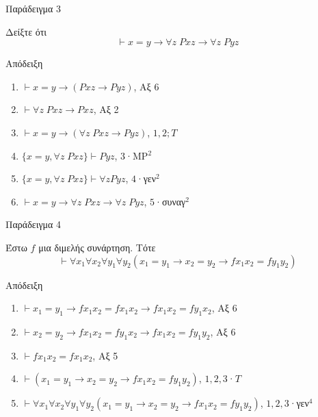 \documentclass{beamer}
\begin{document}
\begin{frame}{Παράδειγμα 3}
  \begin{block}{}
  Δείξτε ότι
    \[
      \vdash x = y \rightarrow \forall z \; Pxz \rightarrow \forall z \; Pyz
    \]
  \end{block}
  \begin{block}{Απόδειξη}
    \begin{enumerate}
      \item $\vdash x = y \rightarrow (Pxz \rightarrow Pyz)$, Αξ 6
      \item $\vdash \forall z \; Pxz \rightarrow Pxz$, Αξ 2
      \item $\vdash x = y \rightarrow (\forall z \; Pxz \rightarrow Pyz)$, $1,2;T$
      \item $\{x = y, \forall z \; Pxz\} \vdash Pyz$, $3$·MP$^2$
      \item $\{x = y, \forall z \; Pxz\} \vdash \forall z Pyz$, $4$·γεν$^2$
      \item $\vdash x = y \rightarrow \forall z \; Pxz \rightarrow \forall z \; Pyz$, $5$·συναγ$^2$
    \end{enumerate}
  \end{block}
\end{frame}

\begin{frame}{Παράδειγμα 4}
  \begin{block}{}
  Έστω $f$ μια διμελής συνάρτηση. Τότε
    \[
      \vdash \forall x_1 \forall x_2 \forall y_1 \forall y_2 (x_1 = y_1 \rightarrow x_2 = y_2 \rightarrow fx_1x_2 = fy_1y_2)
    \]
  \end{block}
  \begin{block}{Απόδειξη}
    \begin{enumerate}
      \item $\vdash x_1 = y_1 \rightarrow fx_1x_2 = fx_1x_2 \rightarrow fx_1x_2 = fy_1x_2$, Αξ 6
      \item $\vdash x_2 = y_2 \rightarrow fx_1x_2 = fy_1x_2 \rightarrow fx_1x_2 = fy_1y_2$, Αξ 6
      \item $\vdash fx_1x_2 = fx_1x_2$, Αξ 5
      \item $\vdash (x_1 = y_1 \rightarrow x_2 = y_2 \rightarrow fx_1x_2 = fy_1y_2)$, $1,2,3$·$T$
      \item $\vdash \forall x_1 \forall x_2 \forall y_1 \forall y_2 (x_1 = y_1 \rightarrow x_2 = y_2 \rightarrow fx_1x_2 = fy_1y_2)$, $1,2,3$·γεν$^4$
    \end{enumerate}
  \end{block}
\end{frame}
\end{document}
